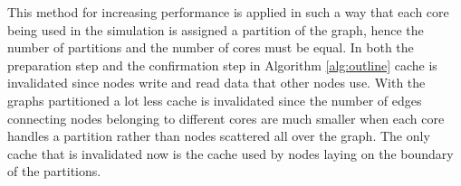 This method for increasing performance is applied in such a way that each core being used in the simulation is assigned a partition of the graph, hence the number of partitions and the number of cores must be equal. In both the preparation step and the confirmation step in Algorithm \ref{alg:outline} cache is invalidated since nodes write and read data that other nodes use. With the graphs partitioned a lot less cache is invalidated since the number of edges connecting nodes belonging to different cores are much smaller when each core handles a partition rather than nodes scattered all over the graph. The only cache that is invalidated now is the cache used by nodes laying on the boundary of the partitions.
